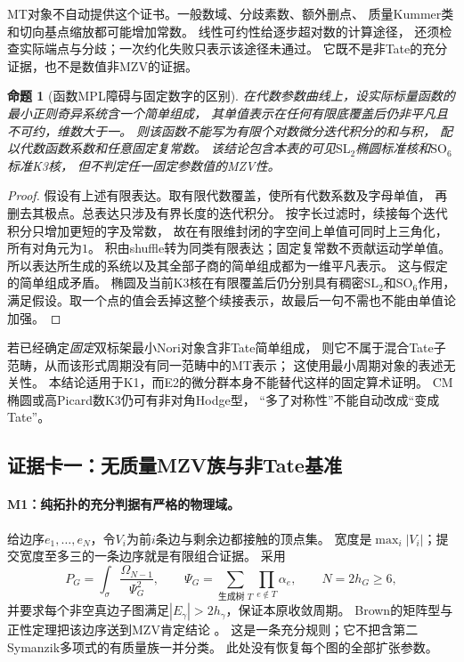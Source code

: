 \documentclass[11pt,a4paper]{ctexart}
\theoremstyle{cnplain}\newtheorem{theorem}{定理}[section]
\newtheorem{proposition}[theorem]{命题}
\theoremstyle{definition}\newtheorem{definition}[theorem]{定义}
\theoremstyle{remark}\newtheorem{remark}[theorem]{注}
\begin{document}
MT对象不自动提供这个证书。一般数域、分歧素数、额外删点、
质量Kummer类和切向基点缩放都可能增加常数。
线性可约性给逐步超对数的计算途径，
还须检查实际端点与分歧；一次约化失败只表示该途径未通过。
它既不是非Tate的充分证据，也不是数值非MZV的证据。

\begin{proposition}[函数MPL障碍与固定数字的区别]\label{prop:classmplobstruction}
在代数参数曲线上，设实际标量函数的最小正则奇异系统含一个简单组成，
其单值表示在任何有限底覆盖后仍非平凡且不可约，维数大于一。
则该函数不能写为有限个对数微分迭代积分的和与积，
配以代数函数系数和任意固定复常数。
该结论包含本表的可见$\mathrm{SL}_2$椭圆标准核和$\mathrm{SO}_6$标准K3核，
但不判定任一固定参数值的MZV性。
\end{proposition}
\begin{proof}
假设有上述有限表达。取有限代数覆盖，使所有代数系数及字母单值，
再删去其极点。总表达只涉及有界长度的迭代积分。
按字长过滤时，续接每个迭代积分只增加更短的字及常数，
故在有限维封闭的字空间上单值可同时上三角化，所有对角元为$1$。
积由shuffle转为同类有限表达；固定复常数不贡献运动学单值。
所以表达所生成的系统以及其全部子商的简单组成都为一维平凡表示。
这与假定的简单组成矛盾。
椭圆及当前K3核在有限覆盖后仍分别具有稠密$\mathrm{SL}_2$和$\mathrm{SO}_6$作用，
满足假设。取一个点的值会丢掉这整个续接表示，故最后一句不需也不能由单值论加强。
\end{proof}

若已经确定\emph{固定}双标架最小Nori对象含非Tate简单组成，
则它不属于混合Tate子范畴，从而该形式周期没有同一范畴中的MT表示；
这使用最小周期对象的表述无关性\cite[\S2.4]{brown}。
本结论适用于K1，而E2的微分群本身不能替代这样的固定算术证明。
CM椭圆或高Picard数K3仍可有非对角Hodge型，
“多了对称性”不能自动改成“变成Tate”。

\subsection{证据卡一：无质量MZV族与非Tate基准}
\label{subsec:classliterature}
\paragraph{M1：纯拓扑的充分判据有严格的物理域。}
给边序$e_1,\ldots,e_N$，令$V_i$为前$i$条边与剩余边都接触的顶点集。
宽度是$\max_i|V_i|$；提交宽度至多三的一条边序就是有限组合证据。
采用
\[
 P_G=\int_{\sigma}\frac{\Omega_{N-1}}{\Psi_G^2},\qquad
 \Psi_G=\sum_{\text{生成树 }T}\prod_{e\notin T}\alpha_e,
 \qquad N=2h_G\ge6,
\]
并要求每个非空真边子图满足$|E_\gamma|>2h_\gamma$，保证本原收敛周期。
Brown的矩阵型与正性定理把该边序送到MZV肯定结论
\cite[Theorems 1--2,118]{ClassWidth}。
这是一条充分规则；它不把含第二Symanzik多项式的有质量族一并分类。
此处没有恢复每个图的全部扩张参数。
\end{document}
